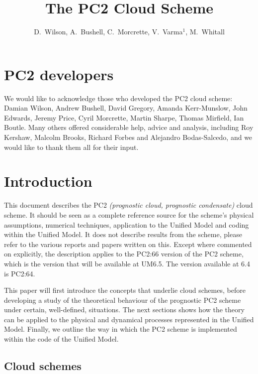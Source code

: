 \documentclass{UMDP_article}
\title{The PC2 Cloud Scheme}
\author{D.~Wilson, A.~Bushell, C.~Morcrette, V.~Varma$^{1}$, M.~Whitall}
\begin{document}
\maketitle

\tableofcontents

\newpage
\section{PC2 developers}
We would like to acknowledge those who developed the PC2 cloud scheme:
Damian Wilson, Andrew Bushell, David Gregory, Amanda Kerr-Munslow,
John Edwards, Jeremy Price, Cyril Morcrette, Martin Sharpe, Thomas Mirfield, Ian Boutle. Many
others offered considerable help, advice and analysis, including Roy Kershaw,
Malcolm Brooks, Richard Forbes and Alejandro Bodas-Salcedo, and we would
like to thank them all for their input.

\section{Introduction}

This document describes the PC2 \textit{(prognostic cloud,
prognostic condensate)} cloud scheme. It should be seen as
a complete reference source for the scheme's  physical assumptions,
numerical techniques,
application to the Unified Model and coding within the Unified Model. It does
not describe results from the scheme, please refer to the various reports and papers
written on this. Except where commented on explicitly, the description applies
to the PC2:66 version of the PC2 scheme, which is the version that will be
available at UM6.5. The version available at 6.4 is PC2:64.

This paper will first introduce the concepts that underlie cloud schemes,
before developing a study of the theoretical behaviour of the prognostic PC2 scheme
under certain, well-defined, situations. The next sections shows how
the theory can be applied to the physical and dynamical processes
represented in the Unified Model. Finally, we outline the way in which
the PC2 scheme is implemented within the code of the Unified Model.


\subsection{Cloud schemes}
\end{document}
